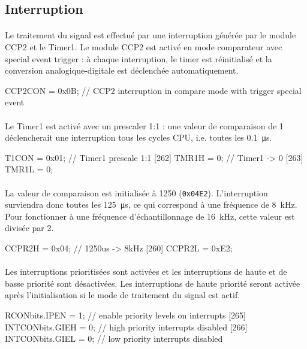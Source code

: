 \documentclass{article}
\begin{document}
    \subsection{Interruption}
    \label{section:interruption}
    \paragraph{}
    Le traitement du signal est effectué par une interruption générée par le module CCP2 et le Timer1. Le module CCP2 est activé en mode comparateur avec special event trigger : à chaque interruption, le timer est réinitialisé et la conversion analogique-digitale est déclenchée automatiquement.
    \begin{verbatimtab}
    [258]    CCP2CON = 0x0B;         // CCP2 interruption in compare mode
                                             with trigger special event
    \end{verbatimtab}

    \paragraph{}
    Le Timer1 est activé avec un prescaler 1:1 : une valeur de comparaison de 1 déclencherait une interruption tous les cycles CPU, i.e. toutes les \SI{0.1}{\micro\second}.
    \begin{verbatimtab}
    [261]    T1CON   = 0x01;         // Timer1 prescale 1:1
    [262]    TMR1H   = 0;            // Timer1 -> 0
    [263]    TMR1L   = 0;
    \end{verbatimtab}

    \paragraph{}
    La valeur de comparaison est initialisée à 1250 (\texttt{0x04E2}). L'interruption surviendra donc toutes les \SI{125}{\micro\second}, ce qui correspond à une fréquence de \SI{8}{\kilo\hertz}. Pour fonctionner à une fréquence d'échantillonnage de \SI{16}{\kilo\hertz}, cette valeur est divisée par 2.
    \begin{verbatimtab}
    [259]    CCPR2H  = 0x04;         // 1250us -> 8kHz
    [260]    CCPR2L  = 0xE2;
    \end{verbatimtab}

    \paragraph{}
    Les interruptions prioritisées sont activées et les interruptions de haute et de basse priorité sont désactivées. Les interruptions de haute priorité seront activée après l'initialisation si le mode de traitement du signal est actif.
    \begin{verbatimtab}
    [264]    RCONbits.IPEN   = 1;    // enable priority levels on interrupts
    [265]    INTCONbits.GIEH = 0;    // high priority interrupts disabled
    [266]    INTCONbits.GIEL = 0;    // low priority interrupts disabled
    \end{verbatimtab}
\end{document}
